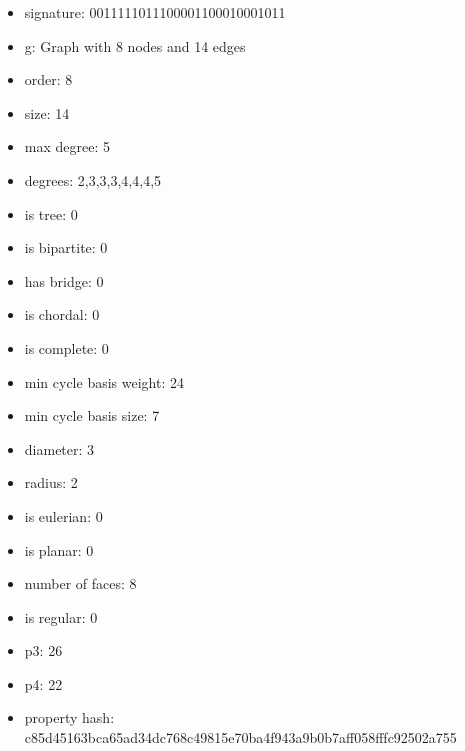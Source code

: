 \begin{itemize}
\item signature: 0011111011100001100010001011
\item g: Graph with 8 nodes and 14 edges
\item order: 8
\item size: 14
\item max degree: 5
\item degrees: 2,3,3,3,4,4,4,5
\item is tree: 0
\item is bipartite: 0
\item has bridge: 0
\item is chordal: 0
\item is complete: 0
\item min cycle basis weight: 24
\item min cycle basis size: 7
\item diameter: 3
\item radius: 2
\item is eulerian: 0
\item is planar: 0
\item number of faces: 8
\item is regular: 0
\item p3: 26
\item p4: 22
\item property hash: c85d45163bca65ad34dc768c49815e70ba4f943a9b0b7aff058fffc92502a755
\end{itemize}
\newpage
\begin{figure}
\end{figure}
